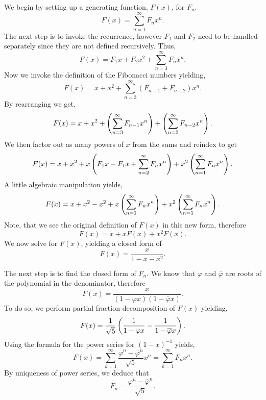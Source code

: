 \documentclass[notitlepage]{problem-solving}
\begin{document}
We begin by setting up a generating function, $F(x)$, for $F_n$.
\[
	F(x) = \sum_{n=1}^\infty F_n x^n.
\]
The next step is to invoke the recurrence, however $F_1$ and $F_2$ need to be handled separately since they are not defined recursively.
Thus,
\[
	F(x) = F_1 x + F_2 x^2 + \sum_{n=3}^\infty F_n x^n.
\]
Now we invoke the definition of the Fibonacci numbers yielding,
\[
	F(x) = x + x^2 + \sum_{n=3}^\infty (F_{n-1} + F_{n-2}) x^n.
\]
By rearranging we get,
\[
	F(x) = x + x^2 +\left( \sum_{n=3}^\infty F_{n-1} x^n \right) + \left( \sum_{n=3}^\infty F_{n-2} x^n \right).
\]
We then factor out as many powers of $x$ from the sums and reindex to get
\[
	F(x) = x + x^2 +x\left( F_1x-F_1x+\sum_{n=2}^\infty F_{n} x^n \right) + x^2\left( \sum_{n=1}^\infty F_{n} x^n \right).
\]
A little algebraic manipulation yields,
\[
	F(x) = x+x^2 -x^2 +x\left( \sum_{n=1}^\infty F_n x^n \right) + x^2 \left( \sum_{n=1}^\infty F_n x^n \right).
\]
Note, that we see the original definition of $F(x)$ in this new form, therefore
\[
	F(x) = x + xF(x) + x^2 F(x).
\]
We now solve for $F(x)$, yielding a closed form of
\[
	F(x) = \frac{x}{1-x-x^2}.
\]

The next step is to find the closed form of $F_n$.
We know that $\varphi$ and $\overline{\varphi}$ are roots of  the polynomial in the denominator, therefore
\[
	F(x)=\frac{x}{(1-\varphi x)(1-\overline{\varphi}x)}.
\]
To do so, we perform partial fraction decomposition of $F(x)$ yielding,
\[
	F(x) = \frac{1}{\sqrt{5}} \left( \frac{1}{1-\varphi x}-\frac{1}{1-\overline{\varphi}x} \right).
\]
Using the formula for the power series for $(1-x)^{-1}$ yields,
\[
	F(x) = \sum_{k=1}^\infty \frac{\varphi^n-\overline{\varphi}^n}{\sqrt{5}} x^n = \sum_{k=1}^\infty F_n x^n.
\]
By uniqueness of power series, we deduce that
\[
	F_n = \frac{\varphi^n-\overline{\varphi}^n}{\sqrt{5}}.
\]

\printbibliography
\end{document}
